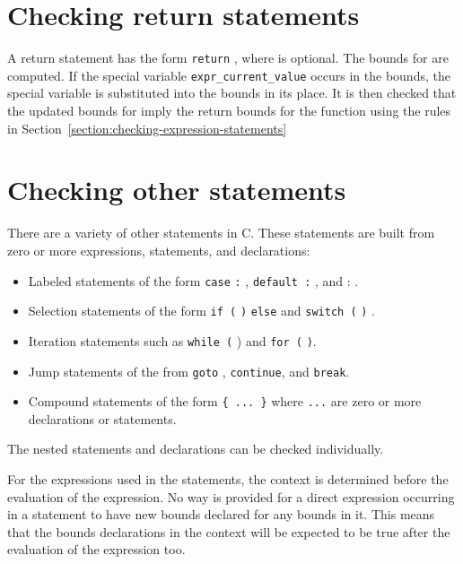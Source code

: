  \section{Checking return statements}

A return statement has the form \texttt{return} , where 
is optional. The bounds for  are computed. If the special
variable \texttt{expr\_current\_value} occurs in the bounds, the special
variable  is substituted into the bounds in its
place. It is then checked that the updated bounds for  imply the
return bounds for the function using the rules in 
Section~\ref{section:checking-expression-statements}

\section{Checking other statements}

There are a variety of other statements in C. These statements are built
from zero or more expressions, statements, and declarations:

\begin{itemize}
\item
  Labeled statements of the form \texttt{case}
   \texttt{:} ,
  \texttt{default :} , and  :
  .
\item
  Selection statements of the form \texttt{if (}
  \texttt{)}  \texttt{else}
   and \texttt{switch (}  \texttt{)}
  .
\item
  Iteration statements such as \texttt{while (}  )
   and \texttt{for
  (}
  \texttt{)}.
\item
  Jump statements of the from \texttt{goto} ,
  \texttt{continue}, and \texttt{break}.
\item
  Compound statements of the form \texttt{\{ ... \}} where \texttt{...}
  are zero or more declarations or statements.
\end{itemize}

The nested statements and declarations can be checked individually.

For the expressions used in the statements, the context is determined
before the evaluation of the expression. No way is provided for a direct
expression occurring in a statement to have new bounds declared for any
bounds in it. This means that the bounds declarations in the context
will be expected to be true after the evaluation of the expression too.

